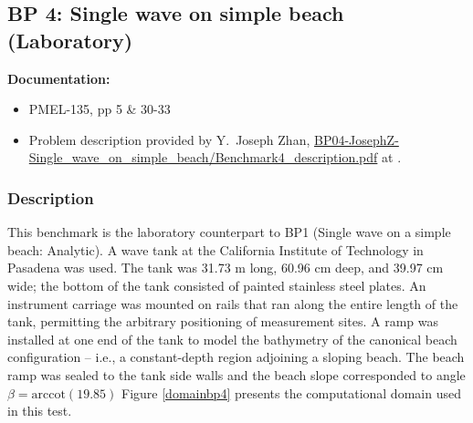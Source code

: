 \newsection

\subsection{BP 4:
 Single wave on simple beach (Laboratory)}


{\bf Documentation:}
\begin {itemize}

\item PMEL-135, pp 5 \& 30-33
\item Problem description provided by Y.\ Joseph Zhan,
\href{https://github.com/rjleveque/nthmp-benchmark-problems/blob/master/BP04-JosephZ-Single_wave_on_simple_beach/Benchmark4_description.pdf}
{BP04-JosephZ-Single\_wave\_on\_simple\_beach/Benchmark4\_description.pdf} 
at \cite{bp-description}.  
\end {itemize}

\subsubsection{Description}
This benchmark is the laboratory counterpart to BP1 (Single wave on a simple beach: Analytic).  A wave tank at the California Institute of Technology in Pasadena was used.  The tank was 31.73 m long, 60.96 cm deep, and 39.97 cm wide; the bottom of the tank consisted of painted stainless
steel plates.  An instrument carriage was mounted on rails that ran along the entire length of the tank, permitting the arbitrary positioning of measurement sites.  A ramp was installed at one end of the tank to model the bathymetry of the canonical beach configuration -- i.e., a constant-depth region adjoining a sloping beach.  The beach ramp was sealed to the tank side walls and the beach slope corresponded to angle $\beta = \text{arccot}(19.85)$  Figure \ref{domainbp4} presents the computational domain used in this test.  

